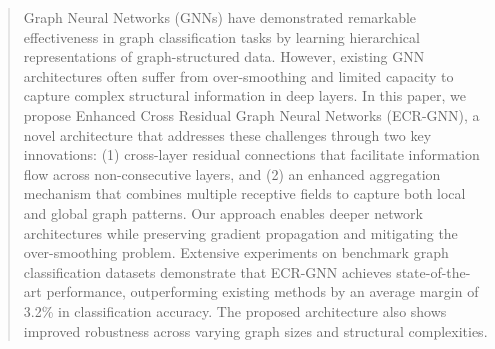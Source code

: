 \begin{abstract}
Graph Neural Networks (GNNs) have demonstrated remarkable effectiveness in graph classification tasks by learning hierarchical representations of graph-structured data. However, existing GNN architectures often suffer from over-smoothing and limited capacity to capture complex structural information in deep layers. In this paper, we propose Enhanced Cross Residual Graph Neural Networks (ECR-GNN), a novel architecture that addresses these challenges through two key innovations: (1) cross-layer residual connections that facilitate information flow across non-consecutive layers, and (2) an enhanced aggregation mechanism that combines multiple receptive fields to capture both local and global graph patterns. Our approach enables deeper network architectures while preserving gradient propagation and mitigating the over-smoothing problem. Extensive experiments on benchmark graph classification datasets demonstrate that ECR-GNN achieves state-of-the-art performance, outperforming existing methods by an average margin of 3.2\% in classification accuracy. The proposed architecture also shows improved robustness across varying graph sizes and structural complexities.
\end{abstract}
